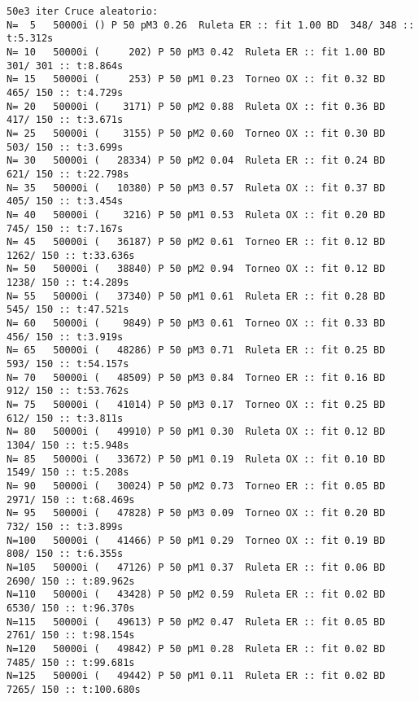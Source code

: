 \documentclass[10pt]{article}
\begin{document}
\begin{verbatim}
50e3 iter Cruce aleatorio:
N=  5   50000i () P 50 pM3 0.26  Ruleta ER :: fit 1.00 BD  348/ 348 :: t:5.312s
N= 10   50000i (     202) P 50 pM3 0.42  Ruleta ER :: fit 1.00 BD  301/ 301 :: t:8.864s
N= 15   50000i (     253) P 50 pM1 0.23  Torneo OX :: fit 0.32 BD  465/ 150 :: t:4.729s
N= 20   50000i (    3171) P 50 pM2 0.88  Ruleta OX :: fit 0.36 BD  417/ 150 :: t:3.671s
N= 25   50000i (    3155) P 50 pM2 0.60  Torneo OX :: fit 0.30 BD  503/ 150 :: t:3.699s
N= 30   50000i (   28334) P 50 pM2 0.04  Ruleta ER :: fit 0.24 BD  621/ 150 :: t:22.798s
N= 35   50000i (   10380) P 50 pM3 0.57  Ruleta OX :: fit 0.37 BD  405/ 150 :: t:3.454s
N= 40   50000i (    3216) P 50 pM1 0.53  Ruleta OX :: fit 0.20 BD  745/ 150 :: t:7.167s
N= 45   50000i (   36187) P 50 pM2 0.61  Torneo ER :: fit 0.12 BD 1262/ 150 :: t:33.636s
N= 50   50000i (   38840) P 50 pM2 0.94  Torneo OX :: fit 0.12 BD 1238/ 150 :: t:4.289s
N= 55   50000i (   37340) P 50 pM1 0.61  Ruleta ER :: fit 0.28 BD  545/ 150 :: t:47.521s
N= 60   50000i (    9849) P 50 pM3 0.61  Torneo OX :: fit 0.33 BD  456/ 150 :: t:3.919s
N= 65   50000i (   48286) P 50 pM3 0.71  Ruleta ER :: fit 0.25 BD  593/ 150 :: t:54.157s
N= 70   50000i (   48509) P 50 pM3 0.84  Torneo ER :: fit 0.16 BD  912/ 150 :: t:53.762s
N= 75   50000i (   41014) P 50 pM3 0.17  Torneo OX :: fit 0.25 BD  612/ 150 :: t:3.811s
N= 80   50000i (   49910) P 50 pM1 0.30  Ruleta OX :: fit 0.12 BD 1304/ 150 :: t:5.948s
N= 85   50000i (   33672) P 50 pM1 0.19  Ruleta OX :: fit 0.10 BD 1549/ 150 :: t:5.208s
N= 90   50000i (   30024) P 50 pM2 0.73  Torneo ER :: fit 0.05 BD 2971/ 150 :: t:68.469s
N= 95   50000i (   47828) P 50 pM3 0.09  Torneo OX :: fit 0.20 BD  732/ 150 :: t:3.899s
N=100   50000i (   41466) P 50 pM1 0.29  Torneo OX :: fit 0.19 BD  808/ 150 :: t:6.355s
N=105   50000i (   47126) P 50 pM1 0.37  Ruleta ER :: fit 0.06 BD 2690/ 150 :: t:89.962s
N=110   50000i (   43428) P 50 pM2 0.59  Ruleta ER :: fit 0.02 BD 6530/ 150 :: t:96.370s
N=115   50000i (   49613) P 50 pM2 0.47  Ruleta ER :: fit 0.05 BD 2761/ 150 :: t:98.154s
N=120   50000i (   49842) P 50 pM1 0.28  Ruleta ER :: fit 0.02 BD 7485/ 150 :: t:99.681s
N=125   50000i (   49442) P 50 pM1 0.11  Ruleta ER :: fit 0.02 BD 7265/ 150 :: t:100.680s


\end{verbatim}
\end{document}

